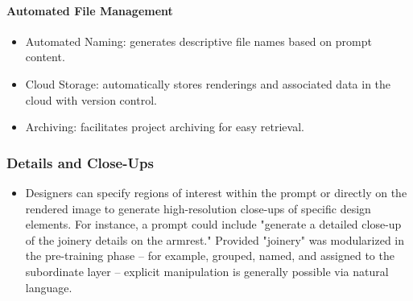 \documentclass[12pt]{article}
\begin{document}
\paragraph{Automated File Management}

\begin{itemize}
    \item Automated Naming: generates descriptive file names based on prompt content.
    \item Cloud Storage: automatically stores renderings and associated data in the cloud with version control.
    \item Archiving: facilitates project archiving for easy retrieval.
\end{itemize}


\subsubsection{Details and Close-Ups}
\begin{itemize} 
    \item Designers can specify regions of interest within the prompt or directly on the rendered image to generate high-resolution close-ups of specific design elements. For instance, a prompt could include "generate a detailed close-up of the joinery details on the armrest." Provided "joinery" was modularized in the pre-training phase -- for example, grouped, named, and assigned to the subordinate layer -- explicit manipulation is generally possible via natural language.
\end{itemize} 
\end{document}
